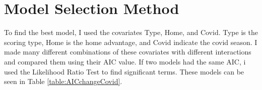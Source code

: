 \section{Model Selection Method}

\noindent To find the best model, I used the covariates Type, Home, and Covid. Type is the scoring type, Home is the home advantage, and Covid indicate the covid season. I made many different combinations of these covariates with different interactions and compared them using their AIC value. If two models had the same AIC, i used the Likelihood Ratio Test to find significant terms. These models can be seen in Table \ref{table:AICchangeCovid}.
